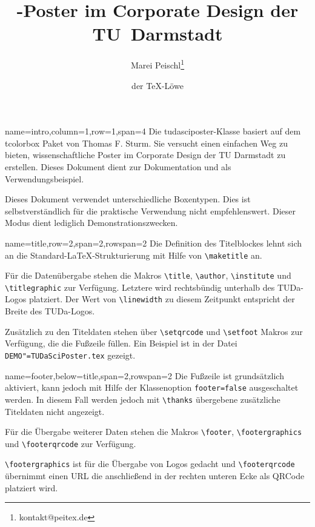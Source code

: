 \documentclass[
	ngerman,%
	accentcolor=9c,%
]{tudasciposter}
\title{\pkg{tcolorbox}-Poster im Corporate Design der TU~Darmstadt}
\author{Marei Peischl\inst{*}\thanks{kontakt@peitex.de} \and der \TeX-Löwe}
\institute{\inst{*}pei\TeX{} \TeX{}nical Solutions, Hamburg}
\newcommand*{\file}[1]{\texttt{#1}}
\newcommand*{\code}[1]{\texttt{#1}}
\newcommand*{\pkg}[1]{\textsf{#1}}
\newcommand*{\cls}[1]{\textsf{#1}}
\newcommand{\tbs}{\textbackslash}
\newcommand*{\macro}[1]{\code{\tbs#1}}
\begin{document}
\begin{tcbposter}[
	poster={
		columns=4,
		rows=7,
		spacing=1cm,
	},]

\begin{posterboxenv}[title=Zusammenfassung]{name=intro,column=1,row=1,span=4}
	Die \cls{tudasciposter}-Klasse basiert auf dem \pkg{tcolorbox} Paket von Thomas F. Sturm.
	Sie versucht einen einfachen Weg zu bieten, wissenschaftliche Poster im Corporate Design der TU Darmstadt zu erstellen. Dieses Dokument dient zur Dokumentation und als Verwendungsbeispiel.

	Dieses Dokument verwendet unterschiedliche Boxentypen. Dies ist selbstverständlich für die praktische Verwendung nicht empfehlenswert. Dieser Modus dient lediglich Demonstrationszwecken.
\end{posterboxenv}

\begin{posterboxenv}[title=Titelei]{name=title,row=2,span=2,rowspan=2}
	Die Definition des Titelblockes lehnt sich an die Standard-\LaTeX{}-Strukturierung mit Hilfe von \macro{maketitle} an.

	Für die Datenübergabe stehen die Makros \macro{title}, \macro{author}, \macro{institute} und \macro{titlegraphic} zur Verfügung. Letztere wird rechtsbündig unterhalb des TUDa-Logos platziert. Der Wert von \macro{linewidth} zu diesem Zeitpunkt entspricht der Breite des TUDa-Logos.

	Zusätzlich zu den Titeldaten stehen über \macro{setqrcode} und \macro{setfoot} Makros zur Verfügung, die die Fußzeile füllen.
	Ein Beispiel ist in der Datei \file{DEMO"=TUDaSciPoster.tex} gezeigt.
\end{posterboxenv}

\begin{posterboxenv}[title=Fußzeile]{name=footer,below=title,span=2,rowspan=2}
	Die Fußzeile ist grundsätzlich aktiviert, kann jedoch mit Hilfe der Klassenoption \code{footer=false} ausgeschaltet werden. In diesem Fall werden jedoch mit \macro{thanks} übergebene zusätzliche Titeldaten nicht angezeigt.

	Für die Übergabe weiterer Daten stehen die Makros \macro{footer}, \macro{footergraphics} und \macro{footerqrcode} zur Verfügung.

	\macro{footergraphics} ist für die Übergabe von Logos gedacht und \macro{footerqrcode} übernimmt einen URL die anschließend in der rechten unteren Ecke als QRCode platziert wird.


\end{posterboxenv}
\end{tcbposter}
\end{document}
